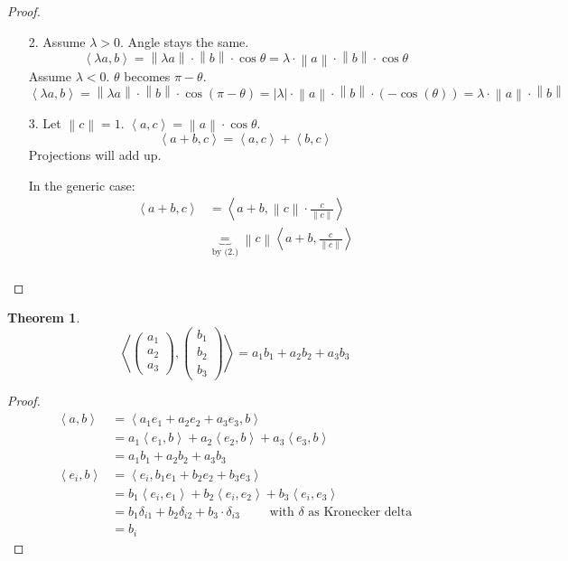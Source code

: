 \documentclass{article}
\newcounter{lecref}[section]
\numberwithin{lecref}{section}
\newtheorem{theorem}[lecref]{Theorem}
\newcommand{\angel}[1]{\left\langle#1\right\rangle}
\newcommand{\norm}[1]{\left\|#1\right\|}
\newcommand{\card}[1]{\left|#1\right|}
\begin{document}
\begin{proof}
  \begin{enumerate}
    \item[2.]
      Assume $\lambda > 0$. Angle stays the same.
      \[ \angel{\lambda a, b} = \norm{\lambda a} \cdot \norm{b} \cdot \cos\theta = \lambda \cdot \norm{a} \cdot \norm{b} \cdot \cos\theta \]
      Assume $\lambda < 0$. $\theta$ becomes $\pi - \theta$.
      \[ \angel{\lambda a, b} = \norm{\lambda a} \cdot \norm{b} \cdot \cos(\pi - \theta) = \card{\lambda} \cdot \norm{a} \cdot \norm{b} \cdot (-\cos(\theta)) = \lambda \cdot \norm a \cdot \norm b \]
    \item[3.]
      Let $\norm{c} = 1$. $\angel{a,c} = \norm a \cdot \cos\theta$.
      \[ \angel{a+b, c} = \angel{a,c} + \angel{b,c} \]
      Projections will add up.

      In the generic case:
      \begin{align*}
        \angel{a+b, c} &= \angel{a+b, \norm c \cdot \frac{c}{\norm{c}}} \\
          &\underbrace{=}_{\text{by (2.)}} \norm c \angel{a+b, \frac{c}{\norm{c}}} \\
      \end{align*}
  \end{enumerate}
\end{proof}

\begin{theorem} %
  \[ \angel{\begin{pmatrix} a_1 \\ a_2 \\ a_3 \end{pmatrix}, \begin{pmatrix} b_1 \\ b_2 \\ b_3 \end{pmatrix}} = a_1 b_1 + a_2 b_2 + a_3 b_3 \]
\end{theorem}

\begin{proof}
  \begin{align*}
    \angel{a,b} &= \angel{a_1 e_1 + a_2 e_2 + a_3 e_3, b} \\
      &= a_1 \angel{e_1, b} + a_2 \angel{e_2, b} + a_3 \angel{e_3, b} \\
      &= a_1 b_1 + a_2 b_2 + a_3 b_3 \\
    \angel{e_i,b} &= \angel{e_i, b_1 e_1 + b_2 e_2 + b_3 e_3} \\
      &= b_1 \angel{e_i, e_1} + b_2 \angel{e_i, e_2} + b_3 \angel{e_i, e_3} \\
      &= b_1 \delta_{i1} + b_2 \delta_{i2} + b_3 \cdot \delta_{i3} \qquad \text{ with } \delta \text{ as Kronecker delta} \\
      &= b_i
  \end{align*}
\end{proof}
\end{document}
